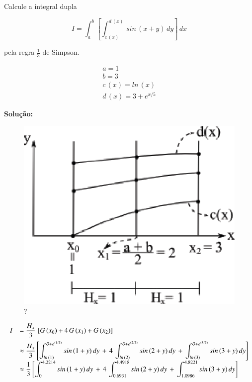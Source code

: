 \begin{example}
 Calcule a integral dupla

\[
 I = \int_a^b \left[ \int_{c\,(x)}^{d\,(x)} \, sin\,(x+y) \, dy \right] \, dx
\]

pela regra $\displaystyle \frac{1}{3}$ de Simpson.

\[
 \begin{array}{l}
  a = 1 \\
  b = 3 \\
  c\,(x) = ln\,(x) \\
  d\,(x) = 3 + e^{x/5}
 \end{array}
\]

\textbf{Solução:}

\begin{figure}[htb]
 \centering
 \includegraphics[scale=1.0]{capitulos/capitulo2/figuras/int_num_dom_bid2.eps}
 \caption{?}
 \label{fig:int_num_dom_bid2}
\end{figure}

\[
 \begin{array}{ll}
  I & = \displaystyle \frac{H_x}{3} \, \left[ G\,(x_0) + 4\,G\,(x_1) + G\,(x_2) \right] \vspace*{0.2cm} \\
    & \approx \displaystyle \frac{H_x}{3} \left[ \int_{ln\,(1)}^{3+e^{(1/5)}} sin\,(1+y)\,dy \, + \, 4\,\int_{ln\,(2)}^{3+e^{(2/5)}} sin\,(2+y)\,dy \, + \, \int_{ln\,(3)}^{3+e^{(3/5)}} sin\,(3+y)\,dy \right] \\
    & \approx \displaystyle \frac{1}{3} \left[ \int_0^{4.2214} sin\,(1+y)\,dy \, + \, 4\,\int_{0.6931}^{4.4918} sin\,(2+y)\,dy \, + \, \int_{1.0986}^{4.8221} sin\,(3+y)\,dy \right]
 \end{array}
\]


\end{example}
